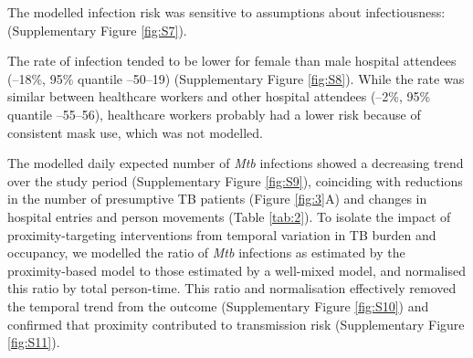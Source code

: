 \documentclass[11pt]{article}
\begin{document}
The modelled infection risk was sensitive to assumptions about infectiousness:  (Supplementary Figure \ref{fig:S7}).\label{chg:R2.8results} 

The rate of infection tended to be lower for female than male hospital attendees (--18\%, 95\% quantile --50--19) (Supplementary Figure \ref{fig:S8}). While the rate was similar between healthcare workers and other hospital attendees (--2\%, 95\% quantile --55--56), healthcare workers probably had a lower risk because of consistent mask use, which was not modelled.

The modelled daily expected number of \emph{Mtb} infections showed a decreasing trend over the study period (Supplementary Figure \ref{fig:S9}), coinciding with reductions in the number of presumptive TB patients (Figure \ref{fig:3}A) and changes in hospital entries and person movements (Table \ref{tab:2}). To isolate the impact of proximity-targeting interventions from temporal variation in TB burden and occupancy, we modelled the ratio of \emph{Mtb} infections as estimated by the proximity-based model to those estimated by a well-mixed model, and normalised this ratio by total person-time. This ratio and normalisation effectively removed the temporal trend from the outcome (Supplementary Figure \ref{fig:S10}) and confirmed that proximity contributed to transmission risk (Supplementary Figure \ref{fig:S11}). \label{chg:R2.26}
\end{document}
